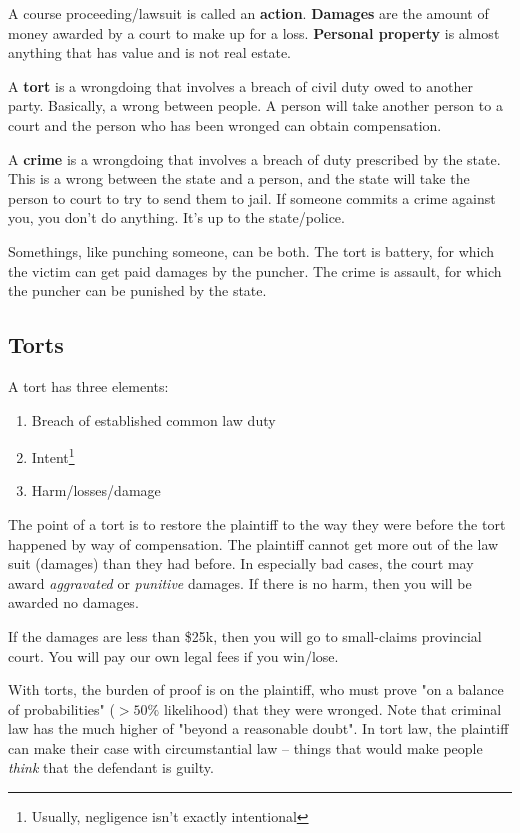 \documentclass{article}
\begin{document}
A course proceeding/lawsuit is called an \textbf{action}. \textbf{Damages} are the amount of money awarded by a court to make up for a loss. \textbf{Personal property} is almost anything that has value and is not real estate.

A \textbf{tort} is a wrongdoing that involves a breach of civil duty owed to another party. Basically, a wrong between people. A person will take another person to a court and the person who has been wronged can obtain compensation.

A \textbf{crime} is a wrongdoing that involves a breach of duty prescribed by the state. This is a wrong between the state and a person, and the state will take the person to court to try to send them to jail. If someone commits a crime against you, you don't do anything. It's up to the state/police.

Somethings, like punching someone, can be both. The tort is battery, for which the victim can get paid damages by the puncher. The crime is assault, for which the puncher can be punished by the state.

\subsection{Torts}

A tort has three elements: \begin{enumerate}
\item Breach of established common law duty
\item Intent\footnote{Usually, negligence isn't exactly intentional}
\item Harm/losses/damage
\end{enumerate}

The point of a tort is to restore the plaintiff to the way they were before the tort happened by way of compensation. The plaintiff cannot get more out of the law suit (damages) than they had before. In especially bad cases, the court may award \textit{aggravated} or \textit{punitive} damages. If there is no harm, then you will be awarded no damages.



If the damages are less than \$25k, then you will go to small-claims provincial court. You will pay our own legal fees if you win/lose.

With torts, the burden of proof is on the plaintiff, who must prove "on a balance of probabilities" ($> 50\%$ likelihood) that they were wronged. Note that criminal law has the much higher of "beyond a reasonable doubt". In tort law, the plaintiff can make their case with circumstantial law -- things that would make people  \textit{think} that the defendant is guilty.
\end{document}
